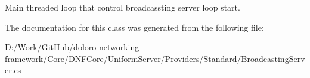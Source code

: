 Main threaded loop that control broadcassting server loop start. 



The documentation for this class was generated from the following file\+:\begin{DoxyCompactItemize}
\item 
D\+:/\+Work/\+Git\+Hub/doloro-\/networking-\/framework/\+Core/\+D\+N\+F\+Core/\+Uniform\+Server/\+Providers/\+Standard/Broadcasting\+Server.\+cs\end{DoxyCompactItemize}

